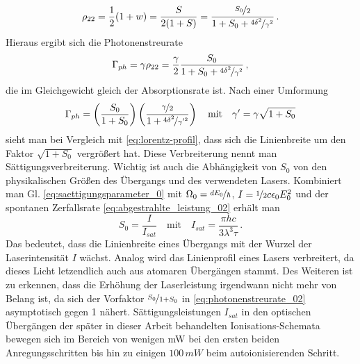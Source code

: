\begin{equation}\label{eq:besetzung_22}
	\rho_{22}=\frac{1}{2}(1+w)=\frac{S}{2(1+S)}=\frac{\nicefrac{S_0}{2}}{1+S_0+\nicefrac{4\delta^2}{\gamma^2}}\,.
\end{equation}
Hieraus ergibt sich die Photonenstreurate
\begin{equation}\label{eq:photonenstreurate_01}
	\Gamma_{ph}=\gamma\rho_{22}=\frac{\gamma}{2}\frac{S_0}{1+S_0+\nicefrac{4\delta^2}{\gamma^2}}\,,
\end{equation}
die im Gleichgewicht gleich der Absorptionsrate ist.
Nach einer Umformung
\begin{equation}\label{eq:photonenstreurate_02}
	\Gamma_{ph}=\left(\frac{S_0}{1+S_0}\right)\left(\frac{\nicefrac{\gamma}{2}}{1+\nicefrac{4\delta^2}{\gamma'^2}}\right)
	\quad\text{mit}\quad
	\gamma'=\gamma\sqrt{1+S_0}
\end{equation}
sieht man bei Vergleich mit \eqref{eq:lorentz-profil}, dass sich die
Linienbreite um den Faktor $\sqrt{1+S_0}$ vergrößert hat. Diese Verbreiterung
nennt man Sättigungsverbreiterung. Wichtig ist auch die Abhängigkeit von $S_0$
von den physikalischen Größen des Übergangs und des verwendeten Lasers.
Kombiniert man Gl. \eqref{eq:saettigungsparameter_0} mit
$\Omega_0=\nicefrac{dE_0}{\hbar}$, $I=\nicefrac{1}{2}c\epsilon_0E_0^2$ und der
spontanen Zerfallsrate \eqref{eq:abgestrahlte_leistung_02} erhält man
\begin{equation}\label{eq:saettigungsparameter_physikalische_groessen}
		S_0=\frac{I}{I_{sat}}
		\quad\text{mit}\quad
		I_{sat}=\frac{\pi hc}{3\lambda^3\tau}\,.
\end{equation}
Das bedeutet, dass die Linienbreite eines Übergangs mit der Wurzel der
Laserintensität $I$ wächst. Analog wird das Linienprofil eines Lasers
verbreitert, da dieses Licht letzendlich auch aus atomaren Übergängen stammt. Des Weiteren
ist zu erkennen, dass die Erhöhung der Laserleistung irgendwann nicht mehr
von Belang ist, da sich der Vorfaktor $\nicefrac{S_0}{1+S_0}$ in
\eqref{eq:photonenstreurate_02} asymptotisch gegen 1 nähert.
Sättigungsleistungen $I_{sat}$ in den optischen Übergängen der später in dieser
Arbeit behandelten Ionisations-Schemata bewegen sich im Bereich von wenigen
mW bei den ersten beiden Anregungsschritten bis hin zu einigen
$100\,mW$ beim autoionisierenden Schritt.

